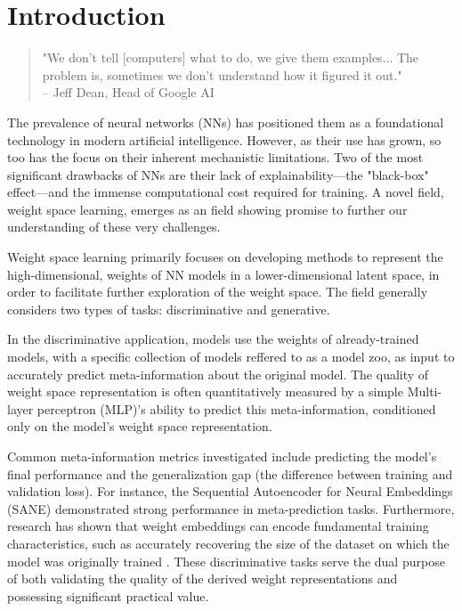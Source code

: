 \graphicspath{{introduction/fig/}}

\chapter{Introduction}
\label{chap:introduction}

\begin{quote}
    "We don't tell [computers] what to do, we give them examples... The problem is, sometimes we don't understand how it figured it out."\\ %
    \vspace{0.5em} %
    \hfill -- Jeff Dean, Head of Google AI \cite{Dean2017BlackBox}
\end{quote}


The prevalence of neural networks (NNs) has positioned them as a foundational technology in modern artificial intelligence. However, as their use has grown, so too has the focus on their inherent mechanistic limitations. Two of the most significant drawbacks of NNs are their lack of explainability---the "black-box" effect---and the immense computational cost required for training. A novel field, weight space learning, emerges as an field showing promise to further our understanding of these very challenges.

Weight space learning primarily focuses on developing methods to represent the high-dimensional, weights of NN models in a lower-dimensional latent space, in order to facilitate further exploration of the weight space. The field generally considers two types of tasks: discriminative and generative.

In the discriminative application, models use the weights of already-trained models, with a specific collection of models reffered to as a model zoo, as input to accurately predict meta-information about the original model. The quality of weight space representation is often quantitatively measured by a simple Multi-layer perceptron (MLP)'s ability to predict this meta-information, conditioned only on the model's weight space representation. 

Common meta-information metrics investigated include predicting the model's final performance and the generalization gap (the difference between training and validation loss). For instance, the Sequential Autoencoder for Neural Embeddings (SANE) \cite{schurholt2024scalableversatileweightspace} demonstrated strong performance in meta-prediction tasks. Furthermore, research has shown that weight embeddings can encode fundamental training characteristics, such as accurately recovering the size of the dataset on which the model was originally trained \cite{salama2024datasetsizerecoverylora}. These discriminative tasks serve the dual purpose of both validating the quality of the derived weight representations and possessing significant practical value.


